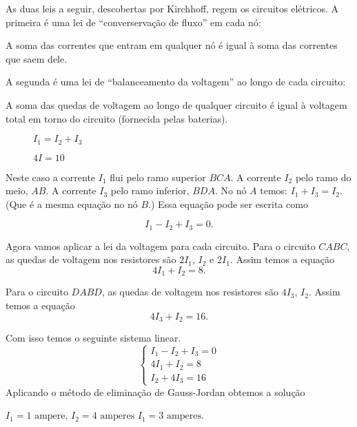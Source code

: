 As duas leis a seguir, descobertas por Kirchhoff, regem os circuitos elétricos. A primeira é uma lei de ``converservação de fluxo'' em cada nó:

\begin{definicao}
    A soma das correntes que entram em qualquer nó é igual à soma das correntes que saem dele.
\end{definicao}

A segunda é uma lei de ``balanceamento da voltagem'' ao longo de cada circuito:

\begin{definicao}
    A soma das quedas de voltagem ao longo de qualquer circuito  é igual à voltagem total em torno do circuito (fornecida pelas baterias).
\end{definicao}

\begin{figure}[!h]
    \centering
    
    \caption{$I_1 = I_2 + I_3$}
\end{figure}

\begin{figure}[!h]
    \centering
    
    \caption{$4I = 10$}
\end{figure}

\begin{figure}[!h]
    \centering
    
\end{figure}

Neste caso a corrente $I_1$ flui pelo ramo superior $BCA$. A corrente $I_2$ pelo ramo do meio, $AB$. A corrente $I_3$ pelo ramo inferior, $BDA$. No nó $A$ temos: $I_1 + I_3 = I_2$. (Que é a mesma equação no nó $B$.)  Essa equação pode ser escrita como

\[
    I_1 - I_2 + I_3 = 0.
\]


Agora vamos aplicar a lei da voltagem para cada circuito. Para o circuito $CABC$, as quedas de voltagem nos resistores são $2I_1$, $I_2$ e $2I_1$. Assim temos a equação
\[
    4I_1 + I_2 = 8.
\]

Para o circuito $DABD$, as quedas de voltagem nos resistores são $4I_3$, $I_2$. Assim temos a equação
\[
    4I_3 + I_2 = 16.
\]

Com isso temos o seguinte sistema linear.
\[
    \begin{cases}
        I_1 - I_2 + I_3 = 0\\
        4I_1 + I_2 = 8\\
        I_2 + 4I_3 = 16
    \end{cases}
\]
Aplicando o método de eliminação de Gauss-Jordan obtemos a solução
\begin{center}
    $I_1 = 1 \mbox{ ampere}$, $I_2 = 4 \mbox{ amperes}$ $I_1 = 3 \mbox{ amperes}$.
\end{center}

